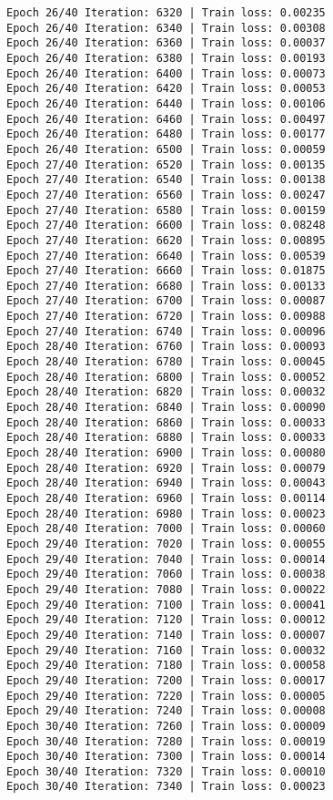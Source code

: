 \documentclass[11pt]{article}
\begin{document}
\begin{Verbatim}[commandchars=\\\{\}]
Epoch 26/40 Iteration: 6320 | Train loss: 0.00235
Epoch 26/40 Iteration: 6340 | Train loss: 0.00308
Epoch 26/40 Iteration: 6360 | Train loss: 0.00037
Epoch 26/40 Iteration: 6380 | Train loss: 0.00193
Epoch 26/40 Iteration: 6400 | Train loss: 0.00073
Epoch 26/40 Iteration: 6420 | Train loss: 0.00053
Epoch 26/40 Iteration: 6440 | Train loss: 0.00106
Epoch 26/40 Iteration: 6460 | Train loss: 0.00497
Epoch 26/40 Iteration: 6480 | Train loss: 0.00177
Epoch 26/40 Iteration: 6500 | Train loss: 0.00059
Epoch 27/40 Iteration: 6520 | Train loss: 0.00135
Epoch 27/40 Iteration: 6540 | Train loss: 0.00138
Epoch 27/40 Iteration: 6560 | Train loss: 0.00247
Epoch 27/40 Iteration: 6580 | Train loss: 0.00159
Epoch 27/40 Iteration: 6600 | Train loss: 0.08248
Epoch 27/40 Iteration: 6620 | Train loss: 0.00895
Epoch 27/40 Iteration: 6640 | Train loss: 0.00539
Epoch 27/40 Iteration: 6660 | Train loss: 0.01875
Epoch 27/40 Iteration: 6680 | Train loss: 0.00133
Epoch 27/40 Iteration: 6700 | Train loss: 0.00087
Epoch 27/40 Iteration: 6720 | Train loss: 0.00988
Epoch 27/40 Iteration: 6740 | Train loss: 0.00096
Epoch 28/40 Iteration: 6760 | Train loss: 0.00093
Epoch 28/40 Iteration: 6780 | Train loss: 0.00045
Epoch 28/40 Iteration: 6800 | Train loss: 0.00052
Epoch 28/40 Iteration: 6820 | Train loss: 0.00032
Epoch 28/40 Iteration: 6840 | Train loss: 0.00090
Epoch 28/40 Iteration: 6860 | Train loss: 0.00033
Epoch 28/40 Iteration: 6880 | Train loss: 0.00033
Epoch 28/40 Iteration: 6900 | Train loss: 0.00080
Epoch 28/40 Iteration: 6920 | Train loss: 0.00079
Epoch 28/40 Iteration: 6940 | Train loss: 0.00043
Epoch 28/40 Iteration: 6960 | Train loss: 0.00114
Epoch 28/40 Iteration: 6980 | Train loss: 0.00023
Epoch 28/40 Iteration: 7000 | Train loss: 0.00060
Epoch 29/40 Iteration: 7020 | Train loss: 0.00055
Epoch 29/40 Iteration: 7040 | Train loss: 0.00014
Epoch 29/40 Iteration: 7060 | Train loss: 0.00038
Epoch 29/40 Iteration: 7080 | Train loss: 0.00022
Epoch 29/40 Iteration: 7100 | Train loss: 0.00041
Epoch 29/40 Iteration: 7120 | Train loss: 0.00012
Epoch 29/40 Iteration: 7140 | Train loss: 0.00007
Epoch 29/40 Iteration: 7160 | Train loss: 0.00032
Epoch 29/40 Iteration: 7180 | Train loss: 0.00058
Epoch 29/40 Iteration: 7200 | Train loss: 0.00017
Epoch 29/40 Iteration: 7220 | Train loss: 0.00005
Epoch 29/40 Iteration: 7240 | Train loss: 0.00008
Epoch 30/40 Iteration: 7260 | Train loss: 0.00009
Epoch 30/40 Iteration: 7280 | Train loss: 0.00019
Epoch 30/40 Iteration: 7300 | Train loss: 0.00014
Epoch 30/40 Iteration: 7320 | Train loss: 0.00010
Epoch 30/40 Iteration: 7340 | Train loss: 0.00023

\end{Verbatim}
\end{document}
